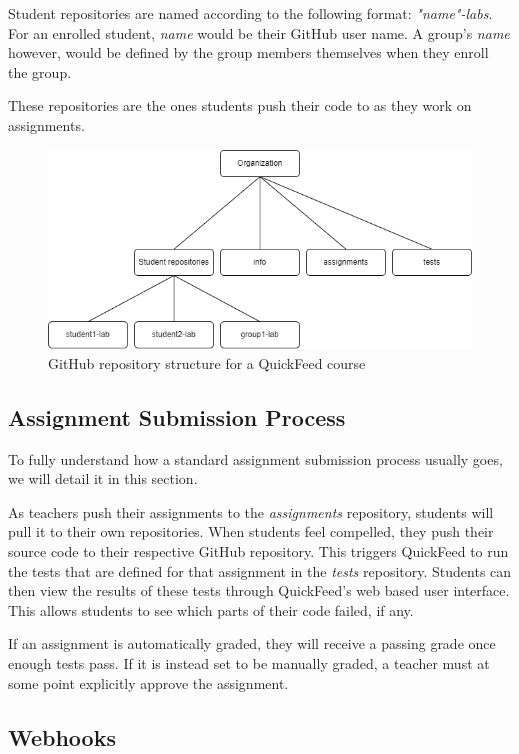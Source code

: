 Student repositories are named according to the following format: \textit{"name"-labs}.
For an enrolled student, \textit{name} would be their GitHub user name.
A group's \textit{name} however, would be defined by the group members themselves when they enroll the group.

These repositories are the ones students push their code to as they work on assignments.

\begin{figure}[ht]
    \centering
    \includegraphics[width=\textwidth]{photos/qf-repository-structure.png}
    \caption{GitHub repository structure for a QuickFeed course}
    \label{fig:qf-repository-structure}
\end{figure}

\subsection{Assignment Submission Process}

To fully understand how a standard assignment submission process usually goes, we will detail it in this section.

As teachers push their assignments to the \textit{assignments} repository, students will pull it to their own repositories.
When students feel compelled, they push their source code to their respective GitHub repository.
This triggers QuickFeed to run the tests that are defined for that assignment in the \textit{tests} repository.
Students can then view the results of these tests through QuickFeed's web based user interface.  
This allows students to see which parts of their code failed, if any.

If an assignment is automatically graded, they will receive a passing grade once enough tests pass.
If it is instead set to be manually graded, a teacher must at some point explicitly approve the assignment.

\subsection{Webhooks}

